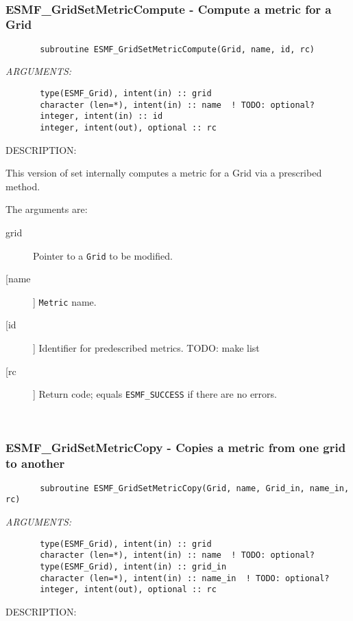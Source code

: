 {%
 
\mbox{}\hrulefill\ 
 
\subsubsection{ESMF\_GridSetMetricCompute - Compute a metric for a Grid}


 
\begin{verbatim}       subroutine ESMF_GridSetMetricCompute(Grid, name, id, rc)\end{verbatim}{\em ARGUMENTS:}
\begin{verbatim}       type(ESMF_Grid), intent(in) :: grid
       character (len=*), intent(in) :: name  ! TODO: optional?
       integer, intent(in) :: id
       integer, intent(out), optional :: rc\end{verbatim}
{\sf DESCRIPTION:\\ }


       This version of set internally computes a metric for a Grid via a
       prescribed method.
  
       The arguments are:
       \begin{description}
       \item[grid] 
            Pointer to a {\tt Grid} to be modified.
       \item [[name]]
             {\tt Metric} name.
       \item[[id]] 
            Identifier for predescribed metrics.  TODO: make list
       \item[[rc]] 
            Return code; equals {\tt ESMF\_SUCCESS} if there are no errors.
       \end{description}
   
 
\mbox{}\hrulefill\ 
 
\subsubsection{ESMF\_GridSetMetricCopy - Copies a metric from one grid to another}


 
\begin{verbatim}       subroutine ESMF_GridSetMetricCopy(Grid, name, Grid_in, name_in, rc)\end{verbatim}{\em ARGUMENTS:}
\begin{verbatim}       type(ESMF_Grid), intent(in) :: grid
       character (len=*), intent(in) :: name  ! TODO: optional?
       type(ESMF_Grid), intent(in) :: grid_in
       character (len=*), intent(in) :: name_in  ! TODO: optional?
       integer, intent(out), optional :: rc            \end{verbatim}
{\sf DESCRIPTION:\\ }


}

